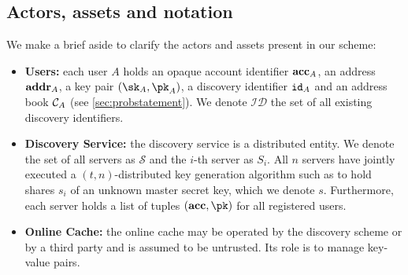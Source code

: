 	\subsection{Actors, assets and notation}
	
		\noindent We make a brief aside to clarify the actors and assets present in our scheme:		
		\begin{itemize}
			\item \textbf{Users:} each user $A$ holds an opaque account identifier $\mathbf{acc}_A$, an address $\mathbf{addr}_A$, a key pair $(\sk_A,\pk_A)$, a discovery identifier $\mathtt{id}_A$ and an address book $\mathcal{C}_{A}$ (see \autoref{sec:probstatement}). We denote $\mathcal{ID}$ the set of all existing discovery identifiers.
			\item \textbf{Discovery Service:} the discovery service is a distributed entity. We denote the set of all servers as $\mathcal{S}$ and the $i$-th server as $S_i$. All $n$ servers have jointly executed a $(t,n)$-distributed key generation algorithm such as to hold shares $s_i$ of an unknown master secret key, which we denote $s$. Furthermore, each server holds a list of tuples $(\acc, \pk)$ for all registered users.
			\item \textbf{Online Cache:} the online cache may be operated by the discovery scheme or by a third party and is assumed to be untrusted. Its role is to manage key-value pairs.
			
			\end{itemize}
			
